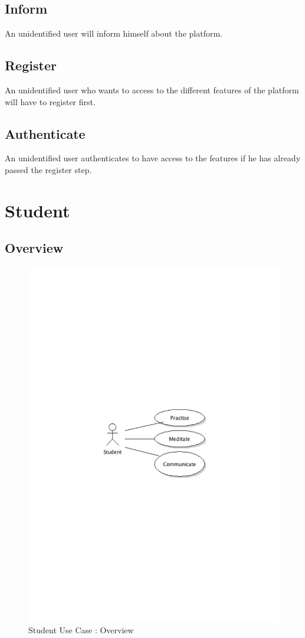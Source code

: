 	\subsection{Inform}An unidentified user will inform himself about the platform.
	\subsection{Register}An unidentified user who wants to access to the different features of the platform will have to register first.
	\subsection{Authenticate}An unidentified user authenticates to have access to the features if he has already passed the register step.
\newpage
\section{Student}
	\subsection{Overview}
		\begin{figure}[ht]
			\begin{center}
				\includegraphics[width=\textwidth,  trim=2cm 12cm 2cm 11cm]{UML_figure/UC/student/UC_Student_General.pdf}
				\caption{Student Use Case : Overview}
			\end{center}
		\end{figure}
